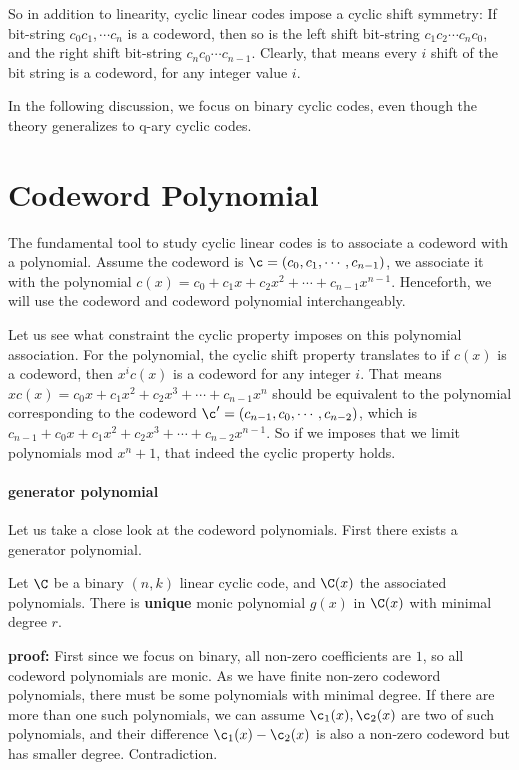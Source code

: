 So in addition to linearity, cyclic linear codes impose a cyclic shift symmetry: If bit-string \(c_0c_1, \cdots c_n\) is a codeword, then so is the left shift bit-string \(c_1c_2 \cdots c_nc_0\), and the right shift bit-string \(c_nc_0\cdots c_{n-1}\). Clearly, that means every \(i\) shift of the bit string is a codeword, for any integer value \(i\). 

In the following discussion, we focus on binary cyclic codes, even though the theory generalizes to q-ary cyclic codes. 

\section{Codeword Polynomial}
The fundamental tool to study cyclic linear codes is to associate a codeword with a polynomial. Assume the codeword is \(\c=(c_0, c_1, \cdots, c_{n-1})\), we associate it with the polynomial \(c(x)= c_0 + c_1 x + c_2 x^2 + \cdots + c_{n-1} x^{n-1}\). Henceforth, we will use the codeword and codeword polynomial interchangeably.  

Let us see what constraint the cyclic property imposes on this polynomial association. For the polynomial, the cyclic shift property translates to if \(c(x)\) is a codeword, then \(x^i c(x)\) is a codeword for any integer \(i\). That means \(xc(x) = c_0x + c_1 x^2 + c_2 x^3 + \cdots + c_{n-1} x^{n} \) should be equivalent to the polynomial corresponding to the codeword \(\c'=(c_{n-1}, c_0, \cdots, c_{n-2})\), which is \(c_{n-1} + c_{0}x + c_1 x^2 + c_2 x^3 + \cdots + c_{n-2} x^{n-1}\). So if we imposes that we limit polynomials mod \(x^n+1\), that indeed the cyclic property holds. 

\paragraph{generator polynomial}
Let us take a close look at the codeword polynomials. First there exists a generator polynomial.   

\begin{theorem}
Let \(\C\) be a binary \((n, k)\) linear cyclic code, and \(\C(x)\) the associated polynomials. There is \textbf{unique} monic polynomial \(g(x)\) in \(\C(x)\) with minimal degree \(r\).
\end{theorem}

\textbf{proof:} First since we focus on binary, all non-zero coefficients are \(1\), so all codeword polynomials are monic. As we have finite non-zero codeword polynomials, there must be some polynomials with minimal degree. If there are more than one such polynomials, we can assume \(\c_1(x), \c_2(x)\) are two of such polynomials, and their difference \(\c_1(x) - \c_2(x)\) is also a non-zero codeword but has smaller degree. Contradiction. 

